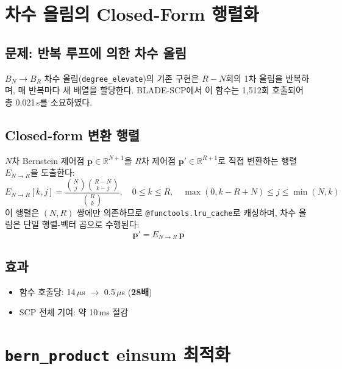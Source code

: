\documentclass[11pt]{article}
\begin{document}
\section{차수 올림의 Closed-Form 행렬화}
\label{sec:degree_elevate}

\subsection{문제: 반복 루프에 의한 차수 올림}

$B_N \to B_R$ 차수 올림(\texttt{degree\_elevate})의 기존 구현은
$R - N$회의 1차 올림을 반복하며, 매 반복마다 새 배열을 할당한다.
BLADE-SCP에서 이 함수는 1,512회 호출되어 총 0.021\,s를 소요하였다.

\subsection{Closed-form 변환 행렬}

$N$차 Bernstein 제어점 $\mathbf{p} \in \mathbb{R}^{N+1}$을
$R$차 제어점 $\mathbf{p}' \in \mathbb{R}^{R+1}$로 직접 변환하는
행렬 $E_{N \to R}$을 도출한다:
\begin{equation}
  E_{N \to R}[k, j] = \frac{\binom{N}{j}\binom{R-N}{k-j}}{\binom{R}{k}},
  \quad 0 \le k \le R, \quad \max(0, k\!-\!R\!+\!N) \le j \le \min(N, k)
  \label{eq:elevate_matrix}
\end{equation}
이 행렬은 $(N, R)$ 쌍에만 의존하므로 \texttt{@functools.lru\_cache}로
캐싱하며, 차수 올림은 단일 행렬-벡터 곱으로 수행된다:
\begin{equation}
  \mathbf{p}' = E_{N \to R} \, \mathbf{p}
\end{equation}

\subsection{효과}

\begin{itemize}
  \item 함수 호출당: 14\,$\mu$s $\to$ 0.5\,$\mu$s (\textbf{28배})
  \item SCP 전체 기여: 약 10\,ms 절감
\end{itemize}


\section{\texttt{bern\_product} einsum 최적화}
\label{sec:einsum}
\end{document}
